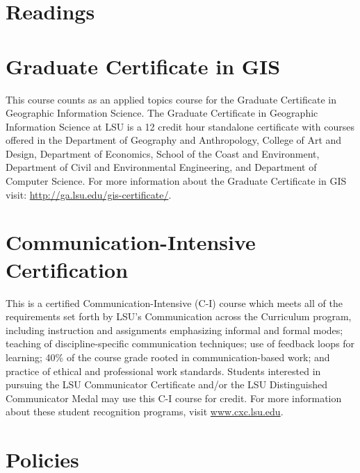 \documentclass[11pt,article,oneside]{memoir}
\begin{document}
\section{Readings}
\vspace*{0.5cm}
\nocite{*}
\setlength{}
\printbibliography[heading=none]

\section{Graduate Certificate in GIS}
This course counts as an applied topics course for the 
Graduate Certificate in Geographic Information Science.
The Graduate Certificate in Geographic Information Science at LSU 
is a 12 credit hour standalone certificate
with courses offered 
in the Department of Geography and Anthropology, 
College of Art and Design, 
Department of Economics, 
School of the Coast and Environment, 
Department of Civil and Environmental Engineering, 
and Department of Computer Science. 
For more information about the Graduate Certificate in GIS visit: 
\url{http://ga.lsu.edu/gis-certificate/}.


\section{Communication-Intensive Certification}
This is a certified Communication-Intensive (C-I) course which meets all of the requirements set forth by LSU's Communication across the Curriculum program, including
instruction and assignments emphasizing informal and formal modes;
teaching of discipline-specific communication techniques;
use of feedback loops for learning;
40\% of the course grade rooted in communication-based work; 
and practice of ethical and professional work standards.
Students interested in pursuing the LSU Communicator Certificate and/or the LSU Distinguished Communicator Medal may use this C-I course for credit. For more information about these student recognition programs, visit \url{www.cxc.lsu.edu}.\\

\section{Policies}
\end{document}
